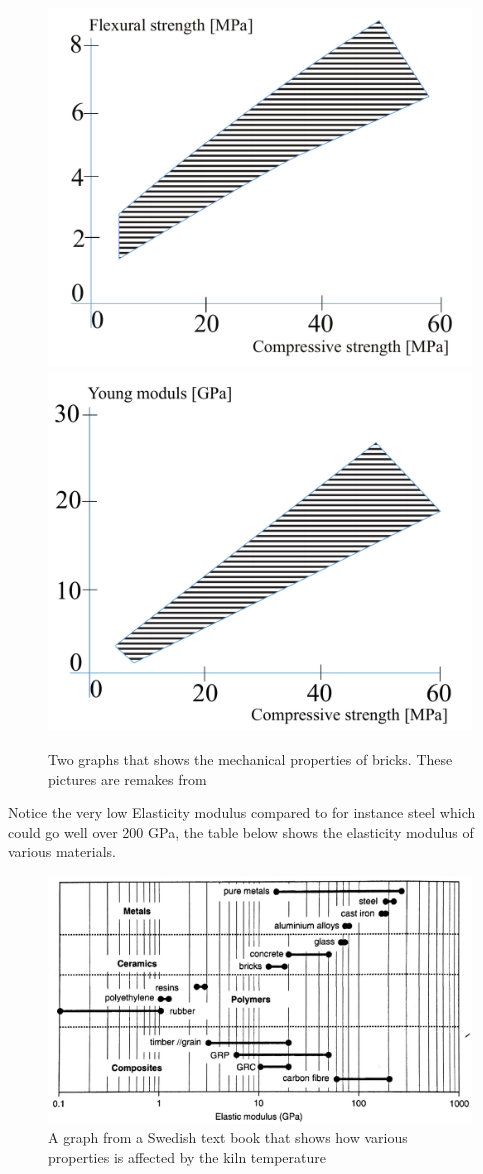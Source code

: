 \begin{figure}[H]
\centering
\includegraphics[width=0.49\linewidth ]{figure/Introduction/BrickProp1.pdf}
\includegraphics[width=0.49\linewidth ]{figure/Introduction/BrickProp2.pdf}
\caption{Two graphs that shows the mechanical properties of bricks. These pictures are remakes from\cite{ref:byggmaterial} }
\end{figure}

Notice the very low Elasticity modulus compared to for instance steel which could go well over 200 GPa, the table below shows the elasticity modulus of various materials.
\begin{figure}[H]
\centering
\includegraphics[width=0.9\linewidth ]{figure/Introduction/elastictymodulus.pdf}
\caption{A graph from a Swedish text book \cite{ref:byggmaterial} that shows how various properties is affected by the kiln temperature}
\end{figure}




